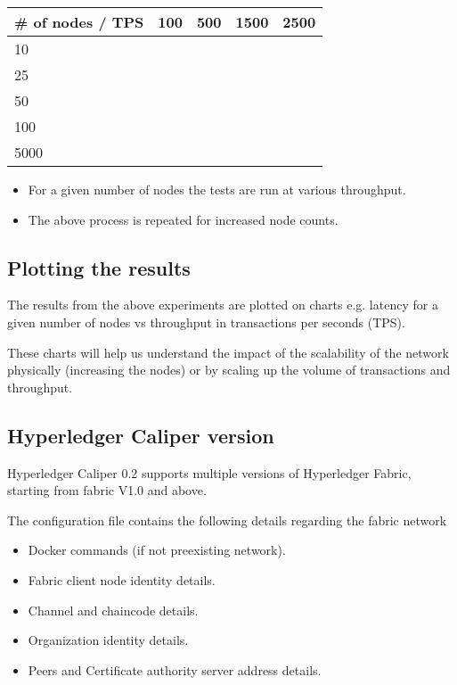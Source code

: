 \documentclass{ceadar_article}
\begin{document}
\begin{tabular}{|l|l|l|l|l|}
\hline
\# of nodes / TPS               & 100 & 500 & 1500 & 2500 \\ \hline
10                                  &     &     &      &      \\ \hline
25                                  &     &     &      &      \\ \hline
50                                  &     &     &      &      \\ \hline
100                                 &     &     &      &      \\ \hline
5000                                &     &     &      &      \\ \hline
\end{tabular}


\begin{itemize}
\item For a given number of nodes the tests are run at various throughput.
\item The above process is repeated for increased node counts.
\end{itemize}

\subsection{Plotting the results}

The results from the above experiments are plotted on charts e.g. latency for a given number of nodes vs throughput in transactions per seconds (TPS).

These charts will help us understand the impact of the scalability of the network physically (increasing the nodes) or by scaling up the volume of transactions and throughput.

\subsection{Hyperledger Caliper version}

Hyperledger Caliper 0.2 supports multiple versions of Hyperledger Fabric, starting from fabric V1.0 and above.

The configuration file contains the following details regarding the fabric network

\begin{itemize}
    \item Docker commands (if not preexisting network).
    \item Fabric client node identity details.
    \item Channel and chaincode details.
    \item Organization identity details.
    \item Peers and Certificate authority server address details.
\end{itemize}
\end{document}
